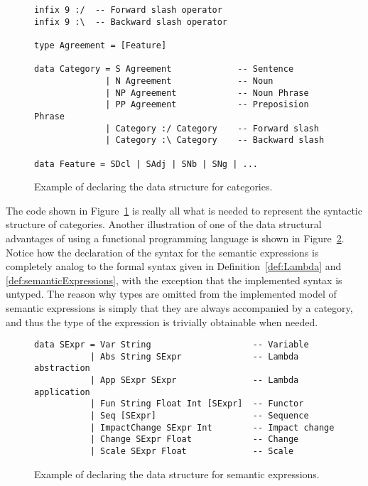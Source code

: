 \begin{figure}[ht]
\begin{cframed}{.9\textwidth}
\vspace{-8pt}
\begin{lstlisting}[language=GHC]
infix 9 :/  -- Forward slash operator
infix 9 :\  -- Backward slash operator

type Agreement = [Feature]

data Category = S Agreement             -- Sentence
              | N Agreement             -- Noun
              | NP Agreement            -- Noun Phrase
              | PP Agreement            -- Preposision Phrase
              | Category :/ Category    -- Forward slash
              | Category :\ Category    -- Backward slash

data Feature = SDcl | SAdj | SNb | SNg | ...
\end{lstlisting}	
\end{cframed}
\caption{Example of declaring the data structure for categories.}
\label{fig:categoryDataType}
\end{figure}

The code shown in Figure~\ref{fig:categoryDataType} is really all what is needed to represent the syntactic structure of categories. Another illustration of one of the data structural advantages of using a functional programming language is shown in Figure~\ref{fig:lambdaDataType}. Notice how the declaration of the syntax for the semantic expressions is completely analog to the formal syntax given in Definition~\ref{def:Lambda} and \ref{def:semanticExpressions}, with the exception that the implemented syntax is untyped. The reason why types are omitted from the implemented model of semantic expressions is simply that they are always accompanied by a category, and thus the type of the expression is trivially obtainable when needed.

\begin{figure}[ht]
\begin{cframed}{.9\textwidth}
\vspace{-8pt}
\begin{lstlisting}[language=GHC]
data SExpr = Var String                    -- Variable
           | Abs String SExpr              -- Lambda abstraction
           | App SExpr SExpr               -- Lambda application
           | Fun String Float Int [SExpr]  -- Functor
           | Seq [SExpr]                   -- Sequence
           | ImpactChange SExpr Int        -- Impact change
           | Change SExpr Float            -- Change
           | Scale SExpr Float             -- Scale
\end{lstlisting}	
\end{cframed}
\caption{Example of declaring the data structure for semantic expressions.}
\label{fig:lambdaDataType}
\end{figure}

